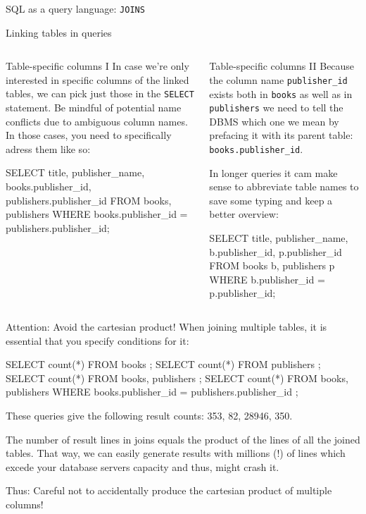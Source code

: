 \begin{frame}{SQL as a query language: \texttt{JOINS}}
\begin{block}{Linking tables in queries}
\end{block}


\framebreak

\begin{columns}
  \begin{block}{Table-specific columns I}\scriptsize
In case we're only interested in specific columns of the linked tables, we can pick just those in the 
 \texttt{SELECT} statement. Be mindful of potential name conflicts due to ambiguous column names. 
In those cases, you need to specifically adress them like so: 
\begin{sqlcode}
SELECT title, publisher_name, 
  books.publisher_id,
  publishers.publisher_id
FROM books, publishers
WHERE books.publisher_id 
  = publishers.publisher_id;
\end{sqlcode}
\end{block}

\begin{block}{Table-specific columns  II}\scriptsize
Because the column name \texttt{publisher\_id} exists both in \texttt{books} as well as in  \texttt{publishers} we need to tell the DBMS which one we mean by prefacing it with its parent table: 
\texttt{books.publisher\_id}.

In longer queries it cam make sense to abbreviate table names to save some typing and keep a better overview: 

\begin{sqlcode}
SELECT title, publisher_name, 
   b.publisher_id, 
   p.publisher_id
FROM books b, publishers p
WHERE b.publisher_id 
   = p.publisher_id;
\end{sqlcode}
\end{block}
\end{columns}

\framebreak

\begin{block}{Attention: Avoid the cartesian product!}\footnotesize
When joining multiple tables, it is essential that you specify conditions for it: 

\begin{sqlcode}
SELECT count(*) FROM books ;
SELECT count(*) FROM publishers ;
SELECT count(*) FROM books, publishers ;
SELECT count(*) FROM books, publishers
WHERE books.publisher_id = publishers.publisher_id ;
\end{sqlcode}
These queries give the following result counts: 353, 82, 28946, 350.

The number of result lines in joins equals the product of the lines of all the joined tables. That way, we can easily generate results with millions (!) of  lines which excede your database servers capacity and thus, might crash it. 

Thus: 
\alert{Careful not to accidentally produce the cartesian product of multiple columns!}

\end{block}
\end{frame}

